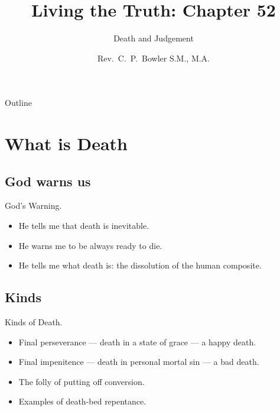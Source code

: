 \documentclass{beamer}
\title[Living the Truth 52] %
{Living the Truth: Chapter 52}
\subtitle
{Death and Judgement} %
\author{Rev.~C.~P.~Bowler S.M., M.A.}
\begin{document}
\begin{frame}
  \titlepage
\end{frame}

\begin{frame}{Outline}
  \tableofcontents
\end{frame}




\section{What is Death}

\subsection{God warns us}

\begin{frame}{God's Warning.}
\begin{itemize}
 \item    He tells me that death is inevitable.
 \item    He warns me to be always ready to die.
 \item    He tells me what death is: the dissolution of the human composite.
\end{itemize}
\end{frame}

\subsection{Kinds}

\begin{frame}{Kinds of Death.}
\begin{itemize}
 \item    Final perseverance --- death in a state of grace --- a happy death.
 \item    Final impenitence --- death in personal mortal sin --- a bad death.
 \item    The folly of putting off conversion.
 \item    Examples of death-bed repentance.
\end{itemize}
\end{frame}
\end{document}
